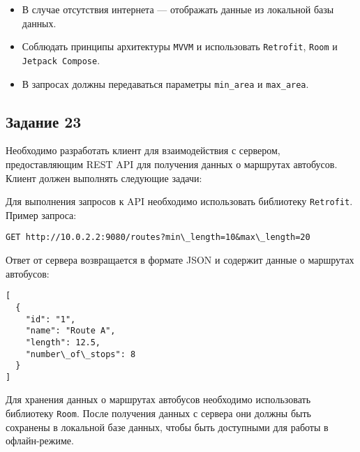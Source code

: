 \documentclass[a4paper,12pt]{article}
\begin{document}
\begin{itemize}
  \item В случае отсутствия интернета — отображать данные из локальной базы данных.
  \item Соблюдать принципы архитектуры \texttt{MVVM} и использовать \texttt{Retrofit}, \texttt{Room} и \texttt{Jetpack Compose}.
  \item В запросах должны передаваться параметры \texttt{min\_area} и \texttt{max\_area}.
\end{itemize}

\subsection*{Задание 23}

Необходимо разработать клиент для взаимодействия с сервером, предоставляющим REST API для получения данных о маршрутах автобусов. Клиент должен выполнять следующие задачи:


Для выполнения запросов к API необходимо использовать библиотеку \texttt{Retrofit}. Пример запроса:

\begin{verbatim}
GET http://10.0.2.2:9080/routes?min\_length=10&max\_length=20
\end{verbatim}

Ответ от сервера возвращается в формате JSON и содержит данные о маршрутах автобусов:

\begin{verbatim}
[
  {
    "id": "1",
    "name": "Route A",
    "length": 12.5,
    "number\_of\_stops": 8
  }
]
\end{verbatim}

Для хранения данных о маршрутах автобусов необходимо использовать библиотеку \texttt{Room}. После получения данных с сервера они должны быть сохранены в локальной базе данных, чтобы быть доступными для работы в офлайн-режиме.
\end{document}
